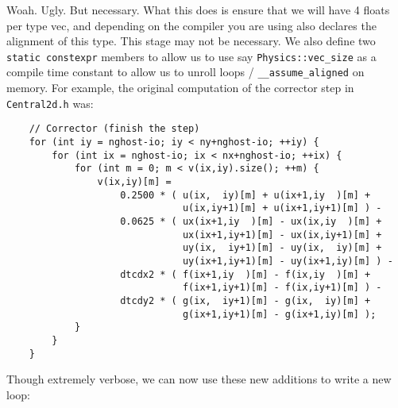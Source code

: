 Woah.  Ugly.  But necessary.  What this does is ensure that we will have 4 floats per type vec, and depending on the compiler you are using also declares the alignment of this type.  This stage may not be necessary.  We also define two \texttt{static constexpr} members to allow us to use say \texttt{Physics::vec\_size} as a compile time constant to allow us to unroll loops / \texttt{\_\_assume\_aligned} on memory.  For example, the original computation of the corrector step in \texttt{Central2d.h} was:
{\tiny
\begin{lstlisting}
    // Corrector (finish the step)
    for (int iy = nghost-io; iy < ny+nghost-io; ++iy) {
        for (int ix = nghost-io; ix < nx+nghost-io; ++ix) {
            for (int m = 0; m < v(ix,iy).size(); ++m) {
                v(ix,iy)[m] =
                    0.2500 * ( u(ix,  iy)[m] + u(ix+1,iy  )[m] +
                               u(ix,iy+1)[m] + u(ix+1,iy+1)[m] ) -
                    0.0625 * ( ux(ix+1,iy  )[m] - ux(ix,iy  )[m] +
                               ux(ix+1,iy+1)[m] - ux(ix,iy+1)[m] +
                               uy(ix,  iy+1)[m] - uy(ix,  iy)[m] +
                               uy(ix+1,iy+1)[m] - uy(ix+1,iy)[m] ) -
                    dtcdx2 * ( f(ix+1,iy  )[m] - f(ix,iy  )[m] +
                               f(ix+1,iy+1)[m] - f(ix,iy+1)[m] ) -
                    dtcdy2 * ( g(ix,  iy+1)[m] - g(ix,  iy)[m] +
                               g(ix+1,iy+1)[m] - g(ix+1,iy)[m] );
            }
        }
    }
\end{lstlisting}
}
Though extremely verbose, we can now use these new additions to write a new loop:

